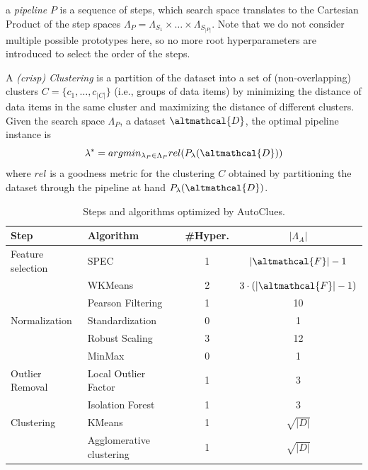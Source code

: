 a \textit{pipeline} $P$ is a sequence of steps, which search space translates to the Cartesian Product of the step spaces $\Lambda_P = \Lambda_{S_1} \times \ldots \times \Lambda_{S_{|P|}}$.
Note that we do not consider multiple possible prototypes here, so no more root hyperparameters are introduced to select the order of the steps.

A \textit{(crisp) Clustering} is a partition of the dataset into a set of (non-overlapping) clusters  $C=\{c_1, \ldots, c_{|C|}\}$ (i.e., groups of data items) by minimizing the distance of data items in the same cluster and maximizing the distance of different clusters.
Given the search space $\Lambda_P$, a dataset $\altmathcal{D}$, the optimal pipeline instance is
\begin{equation}
\label{eq:optimization}
    \lambda^* = argmin_{\lambda_P \in \Lambda_P} rel(P_{\lambda}(\altmathcal{D}))
\end{equation}
where $rel$ is a goodness metric for the clustering $C$ obtained by partitioning the dataset through the pipeline at hand $P_{\lambda}(\altmathcal{D})$.


\begin{table}[!ht]
    \centering
    \begin{tabular}{lp{5cm}cc}
        \hline
        Step     & Algorithm & \#Hyper. & $|\Lambda_A|$\\\hline
        Feature selection & SPEC \cite{zhao2007spectral} & 1 & $|\altmathcal{F}|-1$\\
         & WKMeans \cite{WKMeans} & 2 & $3 \cdot (|\altmathcal{F}|-1)$\\
         & Pearson Filtering & 1 & 10\\
        Normalization     & Standardization & 0 & 1\\
        & Robust Scaling & 3 & 12\\
        & MinMax & 0 & 1\\
        Outlier Removal   & Local Outlier Factor \cite{breunig2000lof} & 1 & 3\\
        & Isolation Forest \cite{liu2012isolation} & 1 & 3\\
        Clustering  & KMeans \cite{arthur2006k} & 1 & $\sqrt{|D|}$\\
        & Agglomerative clustering  \cite{murtagh2017algorithms} & 1 & $\sqrt{|D|}$\\\hline
    \end{tabular}
    \caption{Steps and algorithms optimized by AutoClues.}
    \label{clustering-tbl:processing}
\end{table}


